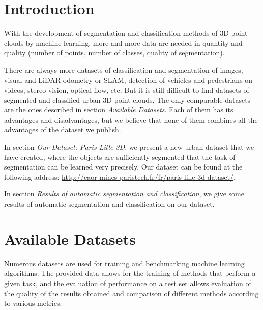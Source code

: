 \documentclass[a4paper, 10pt, journal]{article}
\begin{document}

\section{Introduction}

With the development of segmentation and classification methods of 3D point clouds by machine-learning, more and more data are needed in quantity and quality (number of points, number of classes, quality of segmentation).

There are always more datasets of classification and segmentation of images, visual and LiDAR odometry or SLAM, detection of vehicles and pedestrians on videos, stereo-vision, optical flow, etc. But it is still difficult to find datasets of segmented and classified urban 3D point clouds. The only comparable datasets are the ones described in section \textit{Available Datasets}. Each of them has its advantages and disadvantages, but we believe that none of them combines all the advantages of the dataset we publish.%

In section \textit{Our Dataset: Paris-Lille-3D}, we present a new urban dataset that we have created, where the objects are sufficiently segmented that the task of segmentation can be learned very precisely.
Our dataset can be found at the following address: \href{http://caor-mines-paristech.fr/fr/paris-lille-3d-dataset/}{http://caor-mines-paristech.fr/fr/paris-lille-3d-dataset/}. %

In section \textit{Results of automatic segmentation and classification}, we give some results of automatic segmentation and classification on our dataset.

\section{Available Datasets}
\label{sec:otherDatasets}

Numerous datasets are used for training and benchmarking machine learning algorithms. The provided data allows for the training of methods that perform a given task, and the evaluation of performance on a test set allows evaluation of the quality of the results obtained and comparison of different methods according to various metrics.%
\end{document}
